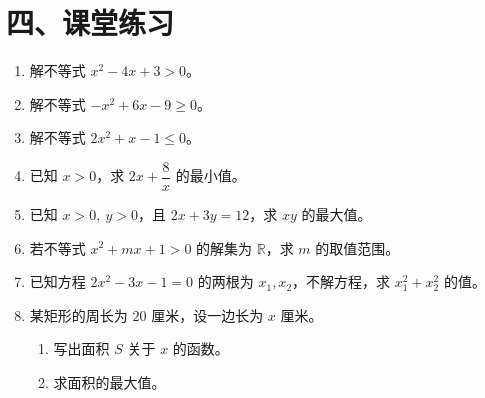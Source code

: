 \documentclass[12pt, a4paper]{ctexart}
\begin{document}
\section*{\textcolor{tipgreen}{四、课堂练习}}

\begin{enumerate}[label=\textbf{\arabic*.}, leftmargin=2em]
  \item 解不等式 $x^2 - 4x + 3 > 0$。

  \item 解不等式 $-x^2 + 6x - 9 \geq 0$。

  \item 解不等式 $2x^2 + x - 1 \leq 0$。

  \item 已知 $x > 0$，求 $2x + \dfrac{8}{x}$ 的最小值。

  \item 已知 $x > 0,\ y > 0$，且 $2x + 3y = 12$，求 $xy$ 的最大值。

  \item 若不等式 $x^2 + mx + 1 > 0$ 的解集为 $\mathbb{R}$，求 $m$ 的取值范围。

  \item 已知方程 $2x^2 - 3x - 1 = 0$ 的两根为 $x_1, x_2$，不解方程，求 $x_1^2 + x_2^2$ 的值。

  \item 某矩形的周长为 $20$ 厘米，设一边长为 $x$ 厘米。
    \begin{enumerate}[label=(\alph*)]
      \item 写出面积 $S$ 关于 $x$ 的函数。
      \item 求面积的最大值。
    \end{enumerate}
\end{enumerate}
\end{document}
